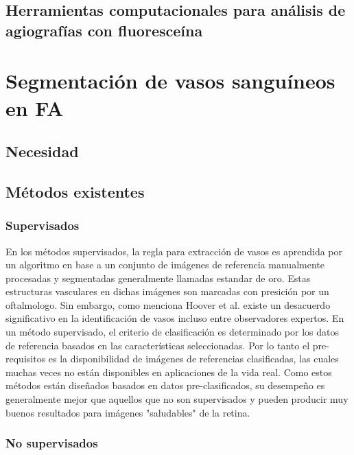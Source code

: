 	\subsection{Herramientas computacionales para an\'alisis de agiograf\'ias con fluoresce\'ina}



\section{Segmentaci\'on de vasos sangu\'ineos en FA}

	\subsection{Necesidad}
	

	\subsection{M\'etodos existentes}



	\subsubsection{Supervisados}

En los m\'etodos supervisados, la regla para extracci\'on de vasos es aprendida por un algoritmo en base a un conjunto de im\'agenes de referencia manualmente procesadas y segmentadas generalmente llamadas estandar de oro. Estas estructuras vasculares en dichas im\'agenes son marcadas con presici\'on por un oftalmologo. Sin embargo, como menciona Hoover et al. \cite{hoover2000locating} existe un desacuerdo significativo en la identificaci\'on de vasos incluso entre observadores expertos. En un m\'etodo supervisado, el criterio de clasificaci\'on es determinado por los datos de referencia basados en las caracter\'isticas seleccionadas. Por lo tanto el pre-requisitos es la disponibilidad de im\'agenes de referencias clasificadas, las cuales muchas veces no est\'an disponibles en aplicaciones de la vida real. Como estos m\'etodos est\'an dise\~nados basados en datos pre-clasificados, su desempeño es generalmente mejor que aquellos que no son supervisados y pueden producir muy buenos resultados para im\'agenes "saludables" de la retina.

	\subsubsection{No supervisados}



